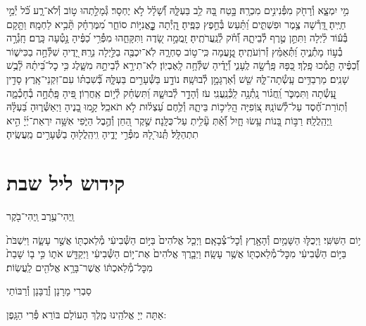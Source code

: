 \documentclass[twoside, openany, parskip=half, 11pt]{book}
\begin{document}
מִ֣י יִמְצָ֑א וְ֯רָחֹ֖ק מִפְּ֯נִינִ֣ים מִכְרָֽהּ׃ \hfill \break
בָּ֣טַח בָּ֭הּ לֵ֥ב בַּעְלָּ֑הּ וְ֝֯שָׁלָ֗ל לֹ֣א יֶחְסָר׃ \hfill \break
גְּ֯מָלַ֣תְהוּ ט֣וֹב וְ֯לֹא־רָ֑ע כֹּ֝֗ל יְ֯מֵ֣י חַיֶּֽיהָ׃ \hfill \break
דָּֽ֭רְ֯שָׁה צֶ֥מֶר וּפִשְׁתִּ֑ים וַ֝תַּ֗עַשׂ בְּ֯חֵ֣פֶץ כַּפֶּֽיהָ׃ \hfill \break
הָֽ֭יְ֯תָה כׇׇׇׇׇׇׇׇּֽאֳנִיּ֣וֹת סוֹחֵ֑ר מִ֝מֶּרְחָ֗ק תָּ֘בִ֥יא לַחְמָֽהּ׃ \hfill \break
וַתָּ֤קָם בְּ֯ע֬וֹד לַ֗יְלָה וַתִּתֵּ֣ן טֶ֣רֶף לְ֯בֵיתָ֑הּ וְ֝֯חֹ֗ק לְ֯נַֽעֲרֹתֶֽיהָ׃ \hfill \break
זָֽמֲמָ֣ה שָׂ֭דֶה וַתִּקָּחֵ֑הוּ מִפְּ֯רִ֥י כַ֝פֶּ֗יהָ נָ֣טְ֯עָה כָּֽרֶם׃ \hfill \break
חָֽגְ֯רָ֣ה בְ֯ע֣וֹז מָתְ֯נֶ֑יהָ וַ֝תְּ֯אַמֵּ֗ץ זְ֯רוֹֽעֹתֶֽיהָ׃ \hfill \break
טָֽ֣֭עֲמָה כִּֽי־ט֣וֹב סַחְרָ֑הּ לֹֽא־יִכְבֶּ֖ה בַלַּ֣יְלָה נֵרָֽהּ׃ \hfill \break
יָ֭דֶיהָ שִׁלְּ֯חָ֣ה בַכִּישׁ֑וֹר וְ֝֯כַפֶּ֗יהָ תָּ֣מְ֯כוּ פָֽלֶךְ׃ \hfill \break
כַּ֭פָּהּ פָּֽרְ֯שָׂ֣ה לֶֽעָנִ֑י וְ֝֯יָדֶ֗יהָ שִׁלְּ֯חָ֥ה לָֽאֶבְיֽוֹן׃ \hfill \break
לֹֽא־תִירָ֣א לְ֯בֵיתָ֣הּ מִשָּׁ֑לֶג כִּ֥י כׇל־בֵּ֝יתָ֗הּ לָ֘בֻ֥שׁ שָׁנִֽים׃ \hfill \break
מַרְבַדִּ֥ים עָֽשְׂ֯תָה־לָּ֑הּ שֵׁ֖שׁ וְ֯אַרְגָּמָ֣ן לְ֯בוּשָֽׁהּ׃ \hfill \break
נוֹדָ֣ע בַּשְּׁ֯עָרִ֣ים בַּעְלָּ֑הּ בְּ֝֯שִׁבְתּ֗וֹ עִם־זִקְנֵי־אָֽרֶץ׃ \hfill \break
סָדִ֣ין עָֽ֭שְׂ֯תָה וַתִּמְכֹּ֑ר וַֽ֝חֲג֗וֹר נָֽתְ֯נָ֥ה לַֽכְּ֯נַֽעֲנִֽי׃ \hfill \break
עֹז וְ֯הָדָ֣ר לְ֯בוּשָׁ֑הּ וַ֝תִּשְׂחַ֗ק לְ֯י֣וֹם אַֽחֲרֽוֹן׃ \hfill \break
פִּ֭יהָ פָּֽתְ֯חָ֣ה בְ֯חָכְ֯מָ֑ה וְ֯תֽוֹרַת־חֶ֝֗סֶד עַל־לְ֯שׁוֹנָֽהּ׃ \hfill \break
צ֭וֹֽפִיָּה הֲֽלִיכ֣וֹת בֵּיתָ֑הּ וְ֯לֶ֥חֶם עַ֝צְל֗וּת לֹ֣א תֹאכֵֽל׃ \hfill \break
קָ֣מוּ בָ֭נֶיהָ וַיְאַשְּׁ֯ר֑וּהָ בַּ֝עְלָּ֗הּ וַֽיְהַֽלֲלָֽהּ׃ \hfill \break
רַבּ֣וֹת בָּ֭נוֹת עָ֥שׂוּ חָ֑יִל וְ֝֯אַ֗תְּ עָ֘לִ֥יתְ עַל־כֻּלָּֽנָה׃ \hfill \break
שֶׁ֣קֶר הַ֭חֵן וְ֯הֶ֣בֶל הַיֹּ֑פִי אִשָּׁ֥ה יִרְאַת־יְ֜יָ֗ הִ֣יא תִתְהַלָּֽל׃\hfill \break
תְּֽ֯נוּ־לָ֭הּ מִפְּ֯רִ֣י יָדֶ֑יהָ וִֽיהַֽלֲל֖וּהָ בַשְּׁ֯עָרִ֣ים מַֽעֲשֶֽׂיהָ׃\hfill \break


\section*{ קידוש ליל שבת }

\begin{small}וַֽיְהִי־עֶ֥רֶב וַֽיְהִי־בֹ֖קֶר\end{small}
י֥וֹם הַשִּׁשִּֽׁי׃ וַיְכֻלּ֛וּ הַשָּׁמַ֥יִם וְ֯הָאָ֖רֶץ וְ֯כׇל־צְ֯בָאָֽם׃ וַיְכַ֤ל אֱלֹהִים֙ בַּיּ֣וֹם הַשְּׁ֯בִיעִ֔י מְ֯לַאכְתּ֖וֹ אֲשֶׁ֣ר עָשָׂ֑ה וַיִּשְׁבֹּת֙ בַּיּ֣וֹם הַשְּׁ֯בִיעִ֔י מִכׇּל־מְ֯לַאכְתּ֖וֹ אֲשֶׁ֥ר עָשָֽׂה׃ וַיְבָ֤רֶךְ אֱלֹהִים֙ אֶת־י֣וֹם הַשְּׁ֯בִיעִ֔י וַיְקַדֵּ֖שׁ אֹת֑וֹ כִּ֣י ב֤וֹ שָׁבַת֙ מִכׇּל־מְ֯לַאכְתּ֔וֹ אֲשֶׁר־בָּרָ֥א אֱלֹהִ֖ים לַֽעֲשֽׂוֹת׃

\begin{footnotesize}
סַבְרִי מָרָנָן וְ֯רֲבָּנָן וְ֯רַבּוֹתַי\\
\end{footnotesize}
אַתָּה יְיָ אֱלֹהֵֽינוּ מֶֽלֶךְ הָעוֹלָם בּוֹרֵא פְּ֯רִי הַגָּֽפֶן:
\end{document}
